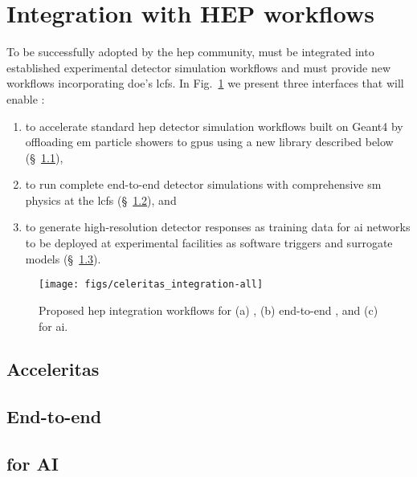 \section{Integration with HEP workflows}

To be successfully adopted by the \ac{hep} community, \celeritas must be
integrated into established experimental detector simulation workflows and must
provide new workflows incorporating \ac{doe}'s \acp{lcf}. In
Fig.~\ref{fig:celeritas-hep-workflows} we present three interfaces that will
enable \celeritas:
\begin{enumerate}[itemsep=0pt, label=(\alph*)]
  \item to accelerate standard \ac{hep} detector simulation workflows built on
    Geant4 by offloading \ac{em} particle showers to \acp{gpu} using a new
    \acceleritas library described below (\S~\ref{sec:acceleritas}),
  \item to run complete end-to-end detector simulations with comprehensive
    \ac{sm} physics at the \acp{lcf} (\S~\ref{sec:end-to-end}), and
  \item to generate high-resolution detector responses as training data for
    \ac{ai} networks to be deployed at experimental facilities as software
    triggers and surrogate models (\S~\ref{sec:celeritas-ai}).
\end{enumerate}
\begin{figure}
    \centering
    \texttt{[image: figs/celeritas\_integration-all]}
    \caption{Proposed \acs{hep} integration workflows for (a) \acceleritas, (b)
    end-to-end \celeritas, and (c) \celeritas for \acs{ai}.}
    \label{fig:celeritas-hep-workflows}
\end{figure}

\subsection{Acceleritas}
\label{sec:acceleritas}

\subsection{End-to-end \celeritas}
\label{sec:end-to-end}


\subsection{\celeritas for AI}
\label{sec:celeritas-ai}
